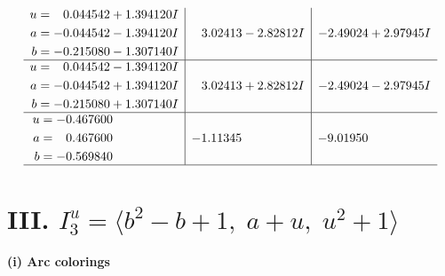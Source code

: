 \documentclass[1p]{elsarticle_modified}
\theoremstyle{definition}
\begin{document}
$$\begin{array}{c|c|c}
\begin{aligned}
u &= \phantom{-}0.044542 + 1.394120 I \\
a &= -0.044542 - 1.394120 I \\
b &= -0.215080 - 1.307140 I\end{aligned}
 & \phantom{-}3.02413 - 2.82812 I & -2.49024 + 2.97945 I \\ \hline\begin{aligned}
u &= \phantom{-}0.044542 - 1.394120 I \\
a &= -0.044542 + 1.394120 I \\
b &= -0.215080 + 1.307140 I\end{aligned}
 & \phantom{-}3.02413 + 2.82812 I & -2.49024 - 2.97945 I \\ \hline\begin{aligned}
u &= -0.467600\phantom{ +0.000000I} \\
a &= \phantom{-}0.467600\phantom{ +0.000000I} \\
b &= -0.569840\phantom{ +0.000000I}\end{aligned}
 & -1.11345\phantom{ +0.000000I} & -9.01950\phantom{ +0.000000I}\\
 \hline 
 \end{array}$$\newpage\newpage\renewcommand{\arraystretch}{1}
\centering \section*{III. $I^u_{3}= \langle b^2- b+1,\;a+u,\;u^2+1 \rangle$}
\flushleft \textbf{(i) Arc colorings}\\
\end{document}
